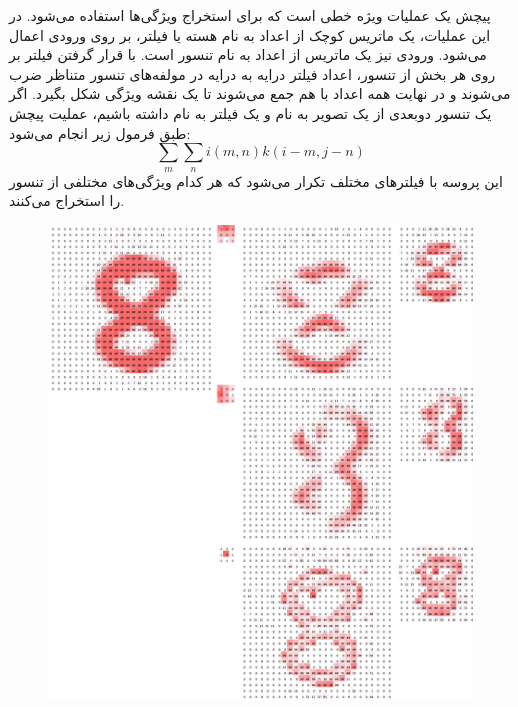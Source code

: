 پیچش یک عملیات ویژه خطی است که برای استخراج ویژگی‌ها استفاده می‌شود. در این عملیات، یک ماتریس کوچک از اعداد به نام هسته یا فیلتر، بر روی ورودی اعمال می‌شود. ورودی نیز یک ماتریس از اعداد به نام تنسور است. با قرار گرفتن فیلتر بر روی هر بخش از تنسور، اعداد فیلتر درایه به درایه در مولفه‌های تنسور متناظر ضرب می‌شوند و در نهایت همه اعداد با هم جمع می‌شوند تا یک نقشه ویژگی شکل بگیرد. اگر یک تنسور دوبعدی از یک تصویر به نام  و یک فیلتر به نام  داشته باشیم، عملیت پیچش طبق فرمول زیر انجام می‌شود:
\begin{equation}
    \sum_{m}\sum_{n} i(m, n)k(i-m, j-n)
\end{equation}
این پروسه با فیلترهای مختلف تکرار می‌شود که هر کدام ویژگی‌های مختلفی از تنسور را استخراج می‌کنند.\begin{figure}[h!]
    \begin{minipage}{0.5\textwidth}
        \centering
        \includegraphics[width=1\linewidth]{figures/Feature_Map.png}
    \end{minipage}
    \hspace{0.3cm}
    \begin{minipage}{0.5\textwidth}

\end{minipage}
\end{figure}
